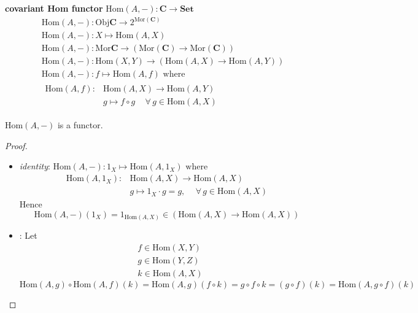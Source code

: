 \begin{definition}
	\textbf{covariant Hom functor} $\text{Hom}(A, -): \mathbf{C} \to \mathbf{Set}$
	\begin{equation}
	\begin{aligned}
	& \text{Hom}(A, - ) : \text{Obj}\mathbf{C} \to  2^{\text{Mor}(\mathbf{C})} \\ 
	& \text{Hom}(A, - ) : X \mapsto \text{Hom}(A,X) \\ 
	& \text{Hom}(A, - ) : \text{Mor}\mathbf{C} \to (\text{Mor}(\mathbf{C}) \to \text{Mor}(\mathbf{C})) \\
	& \text{Hom}(A, - ) : \text{Hom}(X,Y) \to (\text{Hom}(A,X) \to \text{Hom}(A,Y)) \\
	& \text{Hom}(A, - ) : f \mapsto \text{Hom}(A,f) \text{ where } \\
	& \begin{aligned} \text{Hom}(A,f) : & \text{Hom}(A,X) \to \text{Hom}(A,Y) \\ 
	& g\mapsto f\circ g \quad \, \forall \, g \in \text{Hom}(A,X) 
	\end{aligned} 
	\end{aligned}
	\end{equation}
\end{definition}

\begin{claim}
$\text{Hom}(A, -)$ is a functor.
\end{claim}

\begin{proof}
	\begin{itemize}
		\item \emph{identity}: $\text{Hom}(A,-) : 1_X \mapsto \text{Hom}(A, 1_X) \text{ where }$ 
		\[
		\begin{aligned}
			\text{Hom}(A, 1_X) : & \text{Hom}(A,X) \to \text{Hom}(A,X) \\ 
			& g\mapsto 1_X \cdot g = g , \quad \, \forall \, g\in \text{Hom}(A,X)
		\end{aligned}
		\]
		Hence
		\[
		\text{Hom}(A, -)(1_X) = 1_{\text{Hom}(A,X)} \in (\text{Hom}(A,X) \to \text{Hom}(A,X))
		\]
		\item {}: Let 
		\[
		\begin{aligned}
		& f \in \text{Hom}(X,Y) \\ 
		& g \in \text{Hom}(Y,Z) \\ 
		& k \in \text{Hom}(A,X) 
		\end{aligned}
		\]
		\[
		\text{Hom}(A, g) \circ \text{Hom}(A,f)(k) = \text{Hom}(A,g)(f\circ k) = g\circ f \circ k = (g\circ f)(k) = \text{Hom}(A, g\circ f)(k)
		\]
	\end{itemize}
\end{proof}

